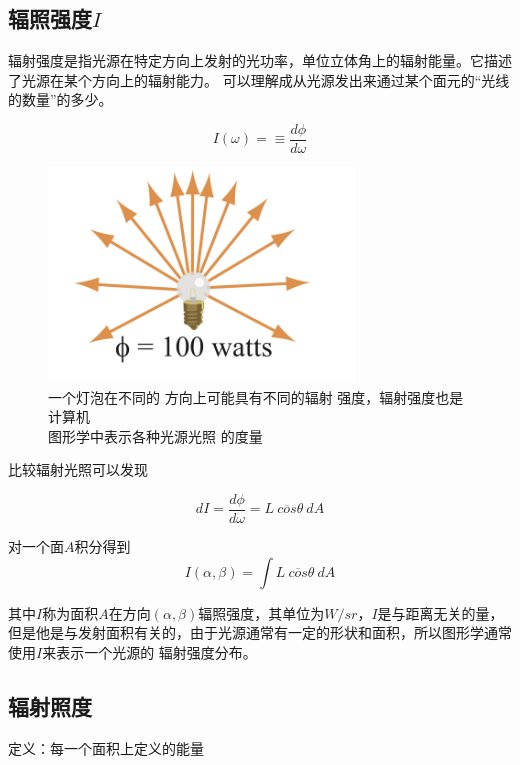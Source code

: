 \subsection*{辐照强度$I$}

辐射强度是指光源在特定方向上发射的光功率，单位立体角上的辐射能量。它描述了光源在某个方向上的辐射能力。
可以理解成从光源发出来通过某个面元的“光线的数量”的多少。

\begin{equation}
    I(\omega)=\equiv \frac{d\phi}{d\omega}
\end{equation}

\begin{figure}[H]
    \centering
    \includegraphics[scale=0.5]{figures/灯泡}
    \caption{一个灯泡在不同的
    方向上可能具有不同的辐射
    强度，辐射强度也是计算机\\
    图形学中表示各种光源光照
    的度量}
\end{figure}

比较辐射光照可以发现

\begin{equation}
    dI=\frac{d\phi}{d\omega}=L\ \overline{cos}\theta\ dA
\end{equation}

对一个面$A$积分得到
\begin{equation}
    I(\alpha,\beta)=\int L\ \overline{cos}\theta\ dA
\end{equation}

其中$I$称为面积$A$在方向$(\alpha,\beta)$辐照强度，其单位为$W/sr$，$I$是与距离无关的量，
但是他是与发射面积有关的，由于光源通常有一定的形状和面积，所以图形学通常使用$I$来表示一个光源的
辐射强度分布。

\subsection*{辐射照度}

定义：每一个面积上定义的能量

